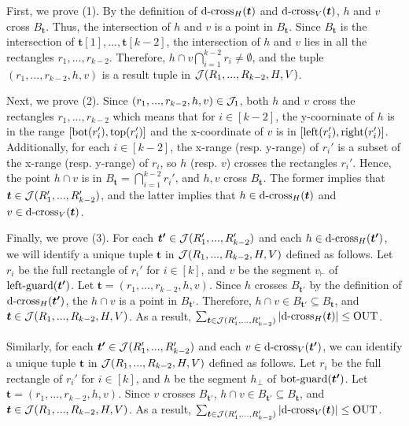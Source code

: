 First, we prove (1). By the definition of $\mathrm{d\text{-}cross}_H(\textrm{\boldmath${t}$})$ and $\mathrm{d\text{-}cross}_V(\textrm{\boldmath${t}$})$, $h$ and $v$ cross $B_\bm{t}$. Thus, the intersection of $h$ and $v$ is a point in $B_\bm{t}$. Since $B_\bm{t}$ is the intersection of $\bm{t}[1],...,\bm{t}[k-2]$, the intersection of $h$ and $v$ lies in all the rectangles $r_1,...,r_{k-2}$. Therefore, $h\cap v\bigcap_{i = 1}^{k-2}r_i \neq \emptyset$, and  the tuple $(r_1,...,r_{k-2},h,v)$ is a result tuple in $\mathcal{J}(R_1,...,R_{k-2},H,V)$. 

Next, we prove (2). Since $(r_1,...,r_{k-2},h,v)\in \mathcal{J}_1$, both $h$
 and $v$ cross the rectangles $r_1,...,r_{k-2}$ which means that for $i\in[k-2]$, the y-coorninate of $h$ is in the range $[\mathrm{bot}(r_i'), \mathrm{top}(r_i')]$ and the x-coordinate of $v$ is in $[\mathrm{left}(r_i'), \mathrm{right}(r_i')]$. Additionally, for each $i\in[k-2]$, the x-range (resp. y-range) of $r_i'$ is a subset of the x-range (resp. y-range) of $r_i$, so $h$ (resp. $v$) crosses the rectangles $r_i'$. Hence, the point $h \cap v$ is in $B_\bm{t} = \bigcap_{i = 1}^{k-2}r_i'$, and $h, v$ cross $B_{\bm{t}}$. The former implies that $\textrm{\boldmath${t}$} \in \mathcal{J}(R_1',...,R_{k-2}')$, and the latter implies that $h \in \mathrm{d\text{-}cross}_H(\textrm{\boldmath${t}$})$ and $v \in \mathrm{d\text{-}cross}_V(\textrm{\boldmath${t}$})$.

Finally, we prove (3). 
For each $\textrm{\boldmath${t'}$}\in  \mathcal{J}(R_1',...,R_{k-2}')$ and each $h \in \mathrm{d\text{-}cross}_H(\textrm{\boldmath${t'}$})$, we will identify a unique tuple $\bm{t}$ in $\mathcal{J}(R_1,...,R_{k-2},H,V)$ defined as follows. Let $r_i$ be the full rectangle of $r_i'$ for $i \in [k]$, and $v$ be the segment $v_\vdash$ of $\mathrm{left\text{-}guard}(\textrm{\boldmath${t'}$})$. Let $\bm{t} = (r_1,...,r_{k-2},h,v)$. Since $h$ crosses $B_{\bm{t'}}$ by the definition of $\mathrm{d\text{-}cross}_H(\textrm{\boldmath${t'}$})$, the $h\cap v$ is a point in $B_{\bm{t'}}$. 
Therefore, $h\cap v \in B_{\bm{t'}} \subseteq B_{\bm{t}}$, and $\textrm{\boldmath${t}$}\in \mathcal{J}(R_1,...,R_{k-2},H,V)$. As a result, $\sum_{\textrm{\boldmath${t}$}\in \mathcal{J}(R_1',...,R_{k-2}')}  |\mathrm{d\text{-}cross}_H(\textrm{\boldmath${t}$})| \leq \mathrm{OUT}$. 

Similarly, for each $\textrm{\boldmath${t'}$}\in  \mathcal{J}(R_1',...,R_{k-2}')$ and each $v \in \mathrm{d\text{-}cross}_V(\textrm{\boldmath${t'}$})$, we can identify a unique tuple $\bm{t}$ in $\mathcal{J}(R_1,...,R_{k-2},H,V)$ defined as follows. Let $r_i$ be the full rectangle of $r_i'$ for $i \in [k]$, and $h$ be the segment $h_\bot$ of $\mathrm{bot\text{-}guard}(\textrm{\boldmath${t'}$})$. Let $\bm{t} = (r_1,...,r_{k-2},h,v)$. Since $v$ crosses $B_{\bm{t'}}$, $h\cap v \in B_{\bm{t'}} \subseteq B_{\bm{t}}$, and $\textrm{\boldmath${t}$}\in \mathcal{J}(R_1,...,R_{k-2},H,V)$. As a result, $\sum_{\textrm{\boldmath${t}$}\in \mathcal{J}(R_1',...,R_{k-2}')}  |\mathrm{d\text{-}cross}_V(\textrm{\boldmath${t}$})| \leq \mathrm{OUT}$. 